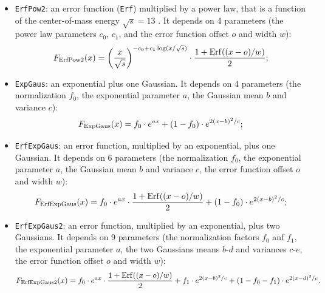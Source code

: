 \begin{itemize}
  \item {\tt ErfPow2}: an error function ({\tt Erf}) multiplied by a power law, that is a function of the center-of-mass energy $\sqrt{s}= 13$ \TeV. It depends on 4 parameters (the power law parameters $c_0$, $c_1$, and the error function offset $o$ and width $w$): $$F_{\rm ErfPow2}(x)={ \left( \frac{x}{\sqrt{s}} \right)}^{- c_0 + c_1 \log(x/\sqrt{s})} \cdot \frac{1 + {\rm Erf}((x-o)/w)}{2};$$
  \item {\tt ExpGaus}: an exponential plus one Gaussian. It depends on 4 parameters (the normalization $f_0$, the exponential parameter $a$, the Gaussian mean $b$ and variance $c$): $$F_{\rm ExpGaus}(x) = f_0 \cdot e^{ax} + (1-f_0) \cdot e^{2(x-b)^2/c};$$
  \item {\tt ErfExpGaus}: an error function, multiplied by an exponential, plus one Gaussian. It depends on 6 parameters (the normalization $f_0$, the exponential parameter $a$, the Gaussian mean $b$ and variance $c$, the error function offset $o$ and width $w$): $$F_{\rm ErfExpGaus}(x) = f_0 \cdot e^{ax} \cdot \frac{1 + {\rm Erf}((x-o)/w)}{2} + (1-f_0) \cdot e^{2(x-b)^2/c};$$
  \item {\tt ErfExpGaus2}: an error function, multiplied by an exponential, plus two Gaussians. It depends on 9 parameters (the normalization factors $f_0$ anf $f_1$, the exponential parameter $a$, the two Gaussians means $b$-$d$ and variances $c$-$e$, the error function offset $o$ and width $w$): $$F_{\rm ErfExpGaus2}(x) = f_0 \cdot e^{ax} \cdot \frac{1 + {\rm Erf}((x-o)/w)}{2} + f_1 \cdot e^{2(x-b)^2/c} + (1-f_0-f_1) \cdot e^{2(x-d)^2/e}.$$
\end{itemize}

